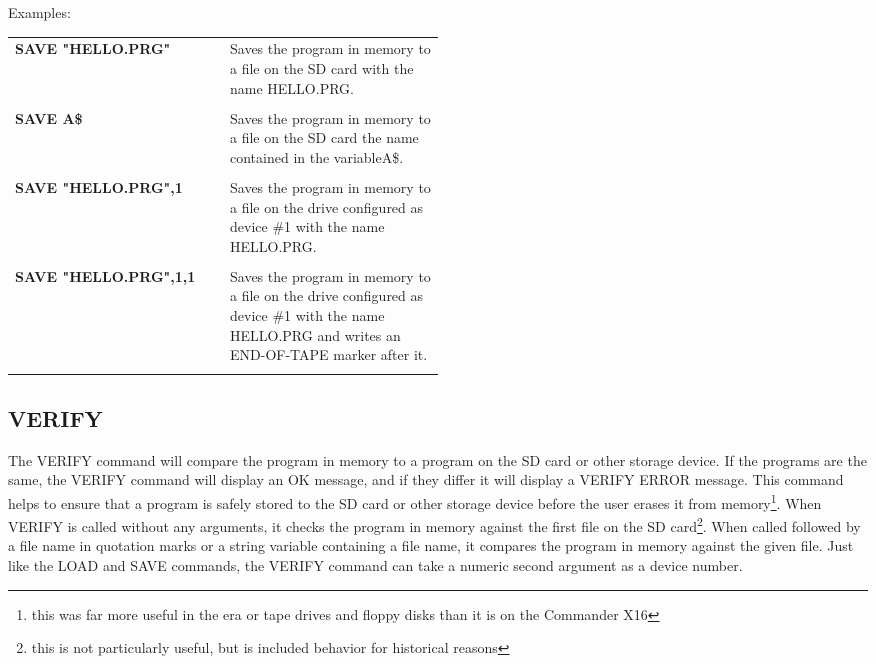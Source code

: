 Examples:\\

\begin{tabular}{l p{0.5\linewidth}}

	{\ttfamily\bfseries SAVE "HELLO.PRG"}&Saves the program in memory to a file
	on the SD card with the name {\ttfamily HELLO.PRG}.\\\\

	{\ttfamily\bfseries SAVE A\$}&Saves the program in memory to a file on the
	SD card the name contained in the variable{\ttfamily A\$}.\\\\

	{\ttfamily\bfseries SAVE "HELLO.PRG",1}&Saves the program in memory to a
	file on the drive configured as device \#1 with the name {\ttfamily
	HELLO.PRG}.\\\\

	{\ttfamily\bfseries SAVE "HELLO.PRG",1,1}&Saves the program in memory to a
	file on the drive configured as device \#1 with the name {\ttfamily
	HELLO.PRG} and writes an {\ttfamily END-OF-TAPE} marker after it.\\\\

\end{tabular}

\subsection{VERIFY}

The {\ttfamily VERIFY} command will compare the program in memory to a program
on the SD card or other storage device.  If the programs are the same, the
{\ttfamily VERIFY} command will display an {\ttfamily OK} message, and if they
differ it will display a {\ttfamily VERIFY ERROR} message.  This command helps
to ensure that a program is safely stored to the SD card or other storage
device before the user erases it from memory\footnote{this was far more useful
in the era or tape drives and floppy disks than it is on the Commander X16}.
When {\ttfamily VERIFY} is called without any arguments, it checks the program
in memory against the first file on the SD card\footnote{this is not
particularly useful, but is included behavior for historical reasons}.  When
called followed by a file name in quotation marks or a string variable
containing a file name, it compares the program in memory against the given
file.  Just like the {\ttfamily LOAD} and {\ttfamily SAVE} commands, the
{\ttfamily VERIFY} command can take a numeric second argument as a device
number.\\

